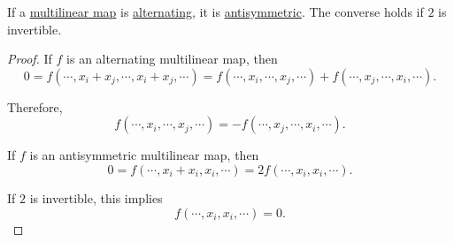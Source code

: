 \begin{proposition}\label{thm:alternating_multilinear_is_antisymmetric}
  If a \hyperref[def:multilinear_function]{multilinear map} is \hyperref[def:alternating_function]{alternating}, it is \hyperref[def:antisymmetric_function]{antisymmetric}. The converse holds if \( 2 \) is invertible.
\end{proposition}
\begin{proof}
  \SufficiencySubProof If \( f \) is an alternating multilinear map, then
  \begin{equation*}
    0
    =
    f(\cdots, x_i + x_j, \cdots, x_i + x_j, \cdots)
    =
    f(\cdots, x_i, \cdots, x_j, \cdots)
    +
    f(\cdots, x_j, \cdots, x_i, \cdots).
  \end{equation*}

  Therefore,
  \begin{equation*}
    f(\cdots, x_i, \cdots, x_j, \cdots)
    =
    -f(\cdots, x_j, \cdots, x_i, \cdots).
  \end{equation*}

  \NecessitySubProof If \( f \) is an antisymmetric multilinear map, then
  \begin{equation*}
    0
    =
    f(\cdots, x_i + x_i, x_i, \cdots)
    =
    2 f(\cdots, x_i, x_i, \cdots).
  \end{equation*}

  If \( 2 \) is invertible, this implies
  \begin{equation*}
    f(\cdots, x_i, x_i, \cdots) = 0.
  \end{equation*}
\end{proof}

